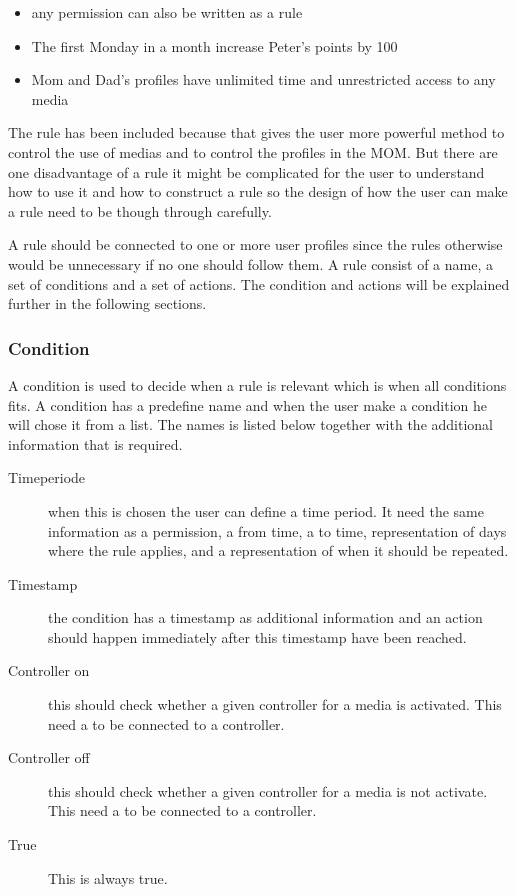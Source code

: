 \begin{itemize}
	\item any permission can also be written as a rule
	\item The first Monday in a month increase Peter's points by 100
	\item Mom and Dad's profiles have unlimited time and unrestricted access to any media
\end{itemize}

The rule has been included because that gives the user more powerful method to control the use of medias and to control the profiles in the MOM.
But there are one disadvantage of a rule it might be complicated for the user to understand how to use it and how to construct a rule so the design of how the user can make a rule need to be though through carefully.

A rule should be connected to one or more user profiles since the rules otherwise would be unnecessary if no one should follow them. A rule consist of a name, a set of conditions and a set of actions. The condition and actions will be explained further in the following sections.
	
\subsubsection{Condition}
A condition is used to decide when a rule is relevant which is when all conditions fits. A condition has a predefine name and when the user make a condition he will chose it from a list. The names is listed below together with the additional information that is required. 

\begin{description}
	\item[Timeperiode] when this is chosen the user can define a time period. It need the same information as a permission, a from time, a to time, representation of days where the rule applies, and a representation of when it should be repeated.
	\item[Timestamp] the condition has a timestamp as additional information and an action should happen immediately after this timestamp have been reached. 
	\item[Controller on] this should check whether a given controller for a media is activated. This need a to be connected to a controller.
	\item[Controller off] this should check whether a given controller for a media is not activate. This need a to be connected to a controller.
	\item[True] This is always true.
\end{description}

